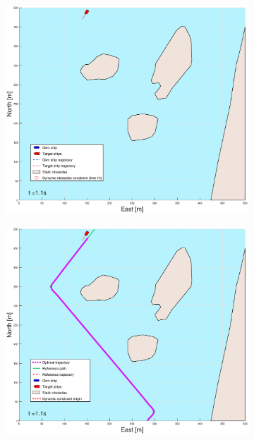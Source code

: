 \begin{figure}[!b] %
    \begin{subfigure}[b]{0.49\textwidth}
        \centering
        \includegraphics[width=\textwidth]{Images/Figures/Helloya/_Simple_0fig1_time=1}
    \end{subfigure}
    \hfill
    \begin{subfigure}[b]{0.499\textwidth}
        \centering
        \includegraphics[width=\textwidth]{Images/Figures/Helloya/_Simple_0fig999_time=1}

\end{subfigure}
\end{figure}
